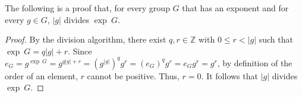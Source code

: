 \documentclass[12pt]{article}
\begin{document}
The following is a proof that, for every group $G$ that has an exponent and for every $g \in G$, $|g|$ divides $\operatorname{exp}~G$.

\begin{proof}
By the division algorithm, there exist $q,r \in {\mathbb Z}$ with $0 \le r<|g|$ such that $\operatorname{exp}~G=q|g|+r$.  Since $e_G=g^{\operatorname{exp}~G}=g^{q|g|+r}=(g^{|g|})^qg^r=(e_G)^qg^r=e_Gg^r=g^r$, by definition of the order of an element, $r$ cannot be positive.  Thus, $r=0$.  It follows that $|g|$ divides $\operatorname{exp}~G$.
\end{proof}
\end{document}
